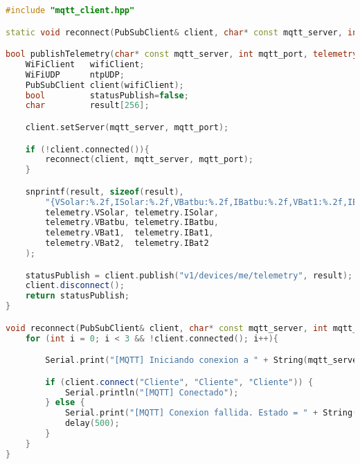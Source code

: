 \begin{lstlisting}[language=c++,caption={Fichero\texttt{mqtt\_client.cpp}}, captionpos=b]
#include "mqtt_client.hpp"

static void reconnect(PubSubClient& client, char* const mqtt_server, int mqtt_port);

bool publishTelemetry(char* const mqtt_server, int mqtt_port, telemetry_t& telemetry){
    WiFiClient   wifiClient;
    WiFiUDP      ntpUDP;
    PubSubClient client(wifiClient);
    bool         statusPublish=false;
    char         result[256];

    client.setServer(mqtt_server, mqtt_port);

    if (!client.connected()){
        reconnect(client, mqtt_server, mqtt_port);
    }

    snprintf(result, sizeof(result), 
        "{VSolar:%.2f,ISolar:%.2f,VBatbu:%.2f,IBatbu:%.2f,VBat1:%.2f,IBat1:%.2f,VBat2:%.2f,IBat2:%.2f}", 
        telemetry.VSolar, telemetry.ISolar, 
        telemetry.VBatbu, telemetry.IBatbu, 
        telemetry.VBat1,  telemetry.IBat1, 
        telemetry.VBat2,  telemetry.IBat2
    );

    statusPublish = client.publish("v1/devices/me/telemetry", result);
    client.disconnect();
    return statusPublish;
}

void reconnect(PubSubClient& client, char* const mqtt_server, int mqtt_port) {
    for (int i = 0; i < 3 && !client.connected(); i++){

        Serial.print("[MQTT] Iniciando conexion a " + String(mqtt_server) + ":" + String(mqtt_port));

        if (client.connect("Cliente", "Cliente", "Cliente")) {
            Serial.println("[MQTT] Conectado");
        } else {
            Serial.print("[MQTT] Conexion fallida. Estado = " + String(client.state()) + ". Reintentando en 0.5 segundos...");
            delay(500);
        }
    }
}
\end{lstlisting}

